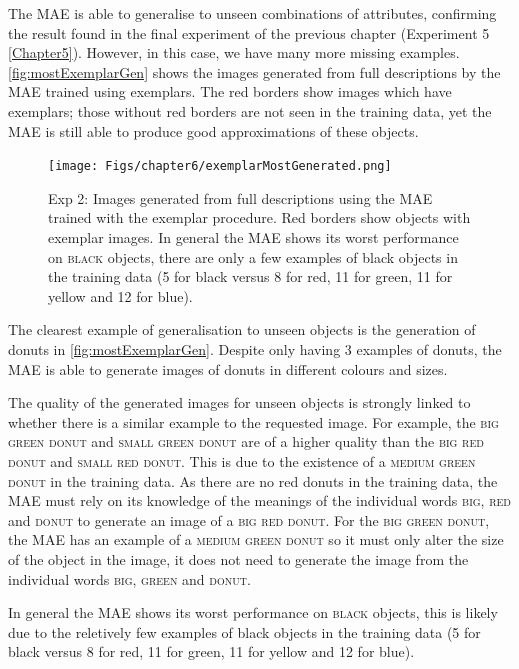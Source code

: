 The \ac{MAE} is able to generalise to unseen combinations of attributes, confirming the result found in the final experiment of the previous chapter (Experiment 5 \autoref{Chapter5}). However, in this case, we have many more missing examples. \autoref{fig:mostExemplarGen} shows the images generated from full descriptions by the \ac{MAE} trained using exemplars. The red borders show images which have exemplars; those without red borders are not seen in the training data, yet the \ac{MAE} is still able to produce good approximations of these objects.

\begin{figure}[ht]
    \centering
    \texttt{[image: Figs/chapter6/exemplarMostGenerated.png]}
    \caption{Exp 2: Images generated from full descriptions using the \ac{MAE} trained with the exemplar procedure. Red borders show objects with exemplar images. In general the \ac{MAE} shows its worst performance on \textsc{black} objects, there are only a few examples of black objects in the training data (5 for black versus 8 for red, 11 for green, 11 for yellow and 12 for blue).}
    \label{fig:mostExemplarGen}
\end{figure}

The clearest example of generalisation to unseen objects is the generation of donuts in \autoref{fig:mostExemplarGen}. Despite only having 3 examples of donuts, the \ac{MAE} is able to generate images of donuts in different colours and sizes.  

The quality of the generated images for unseen objects is strongly linked to whether there is a similar example to the requested image. For example, the \textsc{big green donut} and \textsc{small green donut} are of a higher quality than the \textsc{big red donut} and \textsc{small red donut}. This is due to the existence of a \textsc{medium green donut} in the training data. As there are no red donuts in the training data, the \ac{MAE} must rely on its knowledge of the meanings of the individual words \textsc{big}, \textsc{red} and \textsc{donut} to generate an image of a \textsc{big red donut}. For the \textsc{big green donut}, the \ac{MAE} has an example of a \textsc{medium green donut} so it must only alter the size of the object in the image, it does not need to generate the image from the individual words \textsc{big}, \textsc{green} and \textsc{donut}.

In general the \ac{MAE} shows its worst performance on \textsc{black} objects, this is likely due to the reletively few examples of black objects in the training data (5 for black versus 8 for red, 11 for green, 11 for yellow and 12 for blue).

